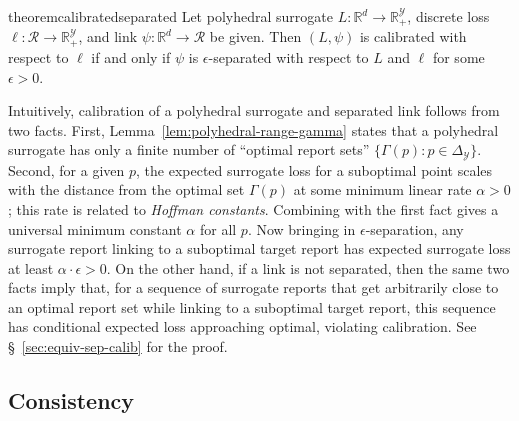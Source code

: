 \documentclass[twoside,11pt]{article}
\newcommand{\restatehack}[1]{}   %
\newcommand{\reals}{\mathbb{R}}
\newcommand{\simplex}{\Delta_\Y}
\newcommand{\R}{\mathcal{R}}
\newcommand{\Y}{\mathcal{Y}}
\begin{document}
\begin{restatable}{theorem}{calibratedseparated} \label{thm:calibrated-separated}
  Let polyhedral surrogate $L:\reals^d \to \reals^\Y_+$, discrete loss $\ell:\R\to\reals^\Y_+$, and link $\psi:\reals^d\to\R$ be given.
  Then $(L,\psi)$ is calibrated with respect to $\ell$ if and only if
  $\psi$ is $\epsilon$-separated with respect to $L$ and $\ell$ for some
  $\epsilon>0$.
\end{restatable}
Intuitively, calibration of a polyhedral surrogate and separated link follows from two facts.
First, Lemma~\ref{lem:polyhedral-range-gamma} states that a polyhedral surrogate has only a finite number of ``optimal report sets'' $\{\Gamma(p) : p \in \simplex\}$.
Second, for a given $p$, the expected surrogate loss for a suboptimal point scales with the distance from the optimal set $\Gamma(p)$ at some minimum linear rate $\alpha > 0$; this rate is related to \emph{Hoffman constants}.
Combining with the first fact gives a universal minimum constant $\alpha$ for all $p$.
Now bringing in $\epsilon$-separation, any surrogate report linking to a suboptimal target report has expected surrogate loss at least $\alpha \cdot \epsilon > 0$.
On the other hand, if a link is not separated, then the same two facts imply that, for a sequence of surrogate reports that get arbitrarily close to an optimal report set while linking to a suboptimal target report, this sequence has conditional expected loss approaching optimal, violating calibration.
See \S~\ref{sec:equiv-sep-calib} for the proof.

\subsection{Consistency}

\restatehack{
  \begin{theorem}
    \label{thm:calibrated-separated}
    \label{thm:thickened-separated}
  \end{theorem}}
\end{document}
